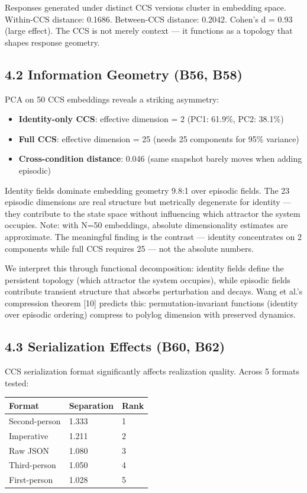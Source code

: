 \documentclass[11pt]{article}
\begin{document}
Responses generated under distinct CCS versions cluster in embedding space.
Within-CCS distance: 0.1686. Between-CCS distance: 0.2042. Cohen's d = 0.93
(large effect). The CCS is not merely context --- it functions as a topology
that shapes response geometry.

\subsection{4.2 Information Geometry (B56, B58)}

PCA on 50 CCS embeddings reveals a striking asymmetry:
\begin{itemize}
\item \textbf{Identity-only CCS}: effective dimension = 2 (PC1: 61.9\%, PC2: 38.1\%)
\item \textbf{Full CCS}: effective dimension = 25 (needs 25 components for 95\% variance)
\item \textbf{Cross-condition distance}: 0.046 (same snapshot barely moves when adding episodic)
\end{itemize}

Identity fields dominate embedding geometry 9.8:1 over episodic fields. The 23
episodic dimensions are real structure but metrically degenerate for identity ---
they contribute to the state space without influencing which attractor the system
occupies. Note: with N=50 embeddings, absolute dimensionality estimates are
approximate. The meaningful finding is the contrast --- identity concentrates on
2 components while full CCS requires 25 --- not the absolute numbers.

We interpret this through functional decomposition: identity fields define the
persistent topology (which attractor the system occupies), while episodic fields
contribute transient structure that absorbs perturbation and decays. Wang et al.'s
compression theorem [10] predicts this: permutation-invariant functions (identity
over episodic ordering) compress to polylog dimension with preserved dynamics.

\subsection{4.3 Serialization Effects (B60, B62)}

CCS serialization format significantly affects realization quality. Across 5
formats tested:

\begin{table}[h]\centering
\begin{tabular}{lll}
\toprule
Format & Separation & Rank \\
\midrule
Second-person & 1.333 & 1 \\
Imperative & 1.211 & 2 \\
Raw JSON & 1.080 & 3 \\
Third-person & 1.050 & 4 \\
First-person & 1.028 & 5 \\
\bottomrule
\end{tabular}
\end{table}
\end{document}
